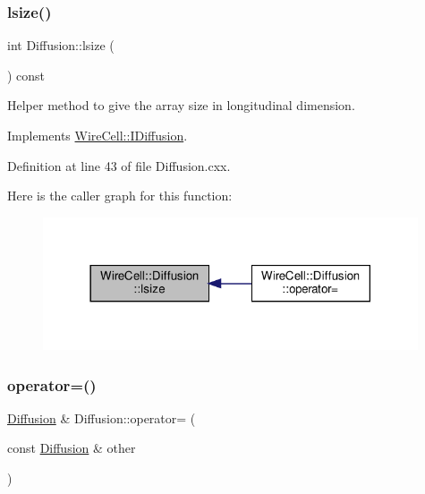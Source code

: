 \subsubsection{\texorpdfstring{lsize()}{lsize()}}
{\footnotesize\ttfamily int Diffusion\+::lsize (\begin{DoxyParamCaption}{ }\end{DoxyParamCaption}) const\hspace{0.3cm}{\ttfamily [virtual]}}



Helper method to give the array size in longitudinal dimension. 



Implements \hyperlink{class_wire_cell_1_1_i_diffusion_a877d15af9f833bc95a7943a0251289af}{Wire\+Cell\+::\+I\+Diffusion}.



Definition at line 43 of file Diffusion.\+cxx.

Here is the caller graph for this function\+:
\nopagebreak
\begin{figure}[H]
\begin{center}
\leavevmode
\includegraphics[width=314pt]{class_wire_cell_1_1_diffusion_aa590710356f717e695ebd9d49e3ef207_icgraph}
\end{center}
\end{figure}
\mbox{\label{class_wire_cell_1_1_diffusion_a245502cf5fcf7e278504f55263668a13}} 
\subsubsection{\texorpdfstring{operator=()}{operator=()}}
{\footnotesize\ttfamily \hyperlink{class_wire_cell_1_1_diffusion}{Diffusion} \& Diffusion\+::operator= (\begin{DoxyParamCaption}\item[{const \hyperlink{class_wire_cell_1_1_diffusion}{Diffusion} \&}]{other }\end{DoxyParamCaption})}



